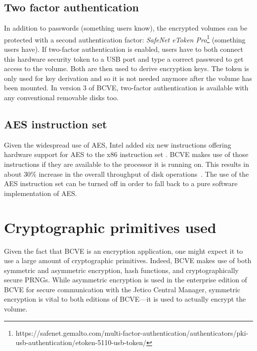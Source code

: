 \documentclass[thesis=B,english]{FITthesis}[2012/10/20]
\begin{document}
	\subsection{Two factor authentication}
	
	In addition to passwords (something users know), the encrypted volumes can be protected with a second authentication factor: \textit{SafeNet eToken Pro}\footnote{https://safenet.gemalto.com/multi-factor-authentication/authenticators/pki-usb-authentication/etoken-5110-usb-token/} (something users have). If two-factor authentication is enabled, users have to both connect this hardware security token to a USB port and type a correct password to get access to the volume. Both are then used to derive encryption keys. The token is only used for key derivation and so it is not needed anymore after the volume has been mounted. In version 3 of BCVE, two-factor authentication is available with any conventional removable disks too.
	
	\subsection{AES instruction set}
	
	Given the widespread use of AES, Intel added six new instructions offering hardware support for AES to the x86 instruction set \cite{aesni}. BCVE makes use of those instructions if they are available to the processor it is running on. This results in about 30\% increase in the overall throughput of disk operations~\cite{bcve_help}. The use of the AES instruction set can be turned off in order to fall back to a pure software implementation of AES. 
	
	\section{Cryptographic primitives used}
	
	Given the fact that BCVE is an encryption application, one might expect it to use a large amount of cryptographic primitives. Indeed, BCVE makes use of both symmetric and asymmetric encryption, hash functions, and cryptographically secure PRNGs. While asymmetric encryption is used in the enterprise edition of BCVE for secure communication with the Jetico Central Manager, symmetric encryption is vital to both editions of BCVE---it is used to actually encrypt the volume. 
	
\end{document}
